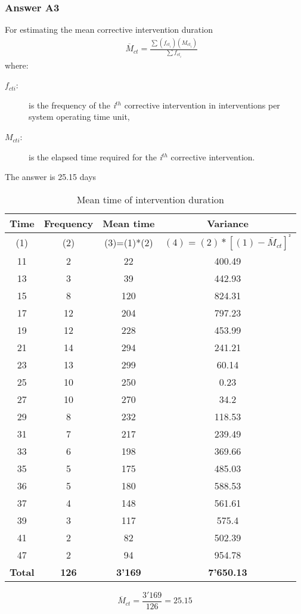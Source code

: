 \subsubsection{Answer A3}
For estimating the mean corrective intervention duration
\begin{eqnarray}
&& {\overline M _{ct}} = \frac{{\sum {\left( {{f_{c{t_i}}}} \right)\left(
{{M_{c{t_i}}}} \right)} }}{{\sum {{f_{c{t_i}}}} }}
\label{eqavaimain:4}
\end{eqnarray}
where:
\begin{adjustwidth}{1cm}{}
\begin{description}
\item[$f_{cti}$:] is the frequency of the \textit{i$^{th}$} corrective intervention in interventions per system operating time unit,
\item[$M_{cti}$:] is the elapsed time required for the \textit{i$^{th}$} corrective intervention.
\end{description}
\end{adjustwidth}
The answer is 25.15 days
\begin{table}[h]
\caption{Mean time of intervention duration}
\begin{tabular}{|c|c|c|c|}
\hline
Time & Frequency & Mean time & Variance \\ 
\hline
(1) & (2) & (3)=(1)*(2) & $(4)=(2)*[(1)- \bar M_{ct}]^²$ \\ 
\hline
11 & 2 & 22 & 400.49 \\ 
\hline
13 & 3 & 39 & 442.93 \\ 
\hline
15 & 8 & 120 & 824.31 \\ 
\hline
17 & 12 & 204 & 797.23 \\ 
\hline
19 & 12 & 228 & 453.99 \\ 
\hline
21 & 14 & 294 & 241.21 \\ 
\hline
23 & 13 & 299 & 60.14 \\ 
\hline
25 & 10 & 250 & 0.23 \\ 
\hline
27 & 10 & 270 & 34.2 \\ 
\hline
29 & 8 & 232 & 118.53 \\ 
\hline
31 & 7 & 217 & 239.49 \\ 
\hline
33 & 6 & 198 & 369.66 \\ 
\hline
35 & 5 & 175 & 485.03 \\ 
\hline
36 & 5 & 180 & 588.53 \\ 
\hline
37 & 4 & 148 & 561.61 \\ 
\hline
39 & 3 & 117 & 575.4 \\ 
\hline
41 & 2 & 82 & 502.39 \\ 
\hline
47 & 2 & 94 & 954.78 \\ 
\hline
\textbf{Total} & \textbf{126} & \textbf{3'169} & \textbf{7'650.13} \\ 
\hline
\end{tabular}
\label{tblavaimain:10}
\end{table}
  \[
   {\overline M _{ct}} = \frac{{3'169}}{{126}} = 25.15
  \]
